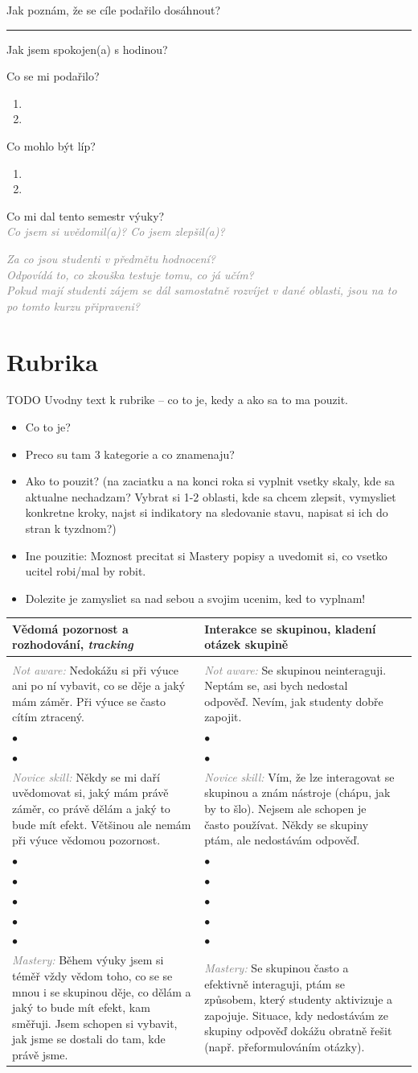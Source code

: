 \documentclass[twoside,openany]{book}
\makeatletter
\newlength{\rulelength}
\newcommand{\note}[1]{\textcolor{gray}{\small\itshape #1}}
\newcommand{\marginsection}[3]{\marginpar{\raisebox{#2\height}{
\begin{turn}{#1}
\bfseries \color{gray} \large
#3\end{turn}}}}
\newcommand{\smileys}{
Jak jsem spokojen(a) s hodinou?
\raisebox{-0.3em}{\,\,\Changey[2]{-2}\,\,\Changey[2]{-1}\,\,\Changey[2]{0}\,\,\Changey[2]{1}\,\,\Changey[2]{2}}
}
\newcommand{\selfassessment}{
Co se mi podařilo?
\begin{enumerate}
\item
\item
\end{enumerate}

Co mohlo být líp?
\begin{enumerate}
\item
\item
\end{enumerate}
}
\newcommand{\rubricpage}[8]{
\newpage
\begin{tabular}{@{}C{0.48\textwidth}C{0.48\textwidth}@{}l@{}}
\normalsize \bfseries #1 & \normalsize \bfseries #5 & \\[1em] \hline \\[-1.2em]
	\justify \note{Not aware:} #2 & \justify \note{Not aware:} #6 & \\[2em]
$\bullet$ & $\bullet$ & \\
$\bullet$ & $\bullet$ & \\
\justify \note{Novice skill:} #3 & \justify \note{Novice skill:} #7 & \\[3em]
$\bullet$ & $\bullet$ & \\
$\bullet$ & $\bullet$ & \\
$\bullet$ & $\bullet$ & \\
$\bullet$ & $\bullet$ & \\
$\bullet$ & $\bullet$ & \\
\justify \note{Mastery:} #4 & \justify \note{Mastery:} #8 &
\end{tabular}
}
\makeatother
\begin{document}
Jak poznám, že se cíle podařilo dosáhnout?

\hspace*{-1cm}
\rule{}{0.4pt}

\marginsection{90}{-1.2}{po výuce}

\smileys

\selfassessment

Co mi dal tento semestr výuky?\\
\note{Co jsem si uvědomil(a)? Co jsem zlepšil(a)?}

\newpage
\marginsection{-90}{1}{volné poznámky}
\vspace*{-2em}
\note{Za co jsou studenti v předmětu hodnocení?\\
Odpovídá to, co zkouška testuje tomu, co já učím?\\
Pokud mají studenti zájem se dál samostatně rozvíjet v dané oblasti, jsou na to po tomto kurzu připraveni?}


\restoregeometry
\chapter*{Rubrika}

TODO Uvodny text k rubrike -- co to je, kedy a ako sa to ma pouzit.
\begin{itemize}
\item Co to je?
\item Preco su tam 3 kategorie a co znamenaju?
\item Ako to pouzit? (na zaciatku a na konci roka si vyplnit vsetky skaly, kde sa aktualne nechadzam? Vybrat si 1-2 oblasti, kde sa chcem zlepsit, vymysliet konkretne kroky, najst si indikatory na sledovanie stavu, napisat si ich do stran k tyzdnom?)
\item Ine pouzitie: Moznost precitat si Mastery popisy a uvedomit si, co vsetko ucitel robi/mal by robit.
\item Dolezite je zamysliet sa nad sebou a svojim ucenim, ked to vyplnam!
\end{itemize}

\newpage
\rubricpage{Vědomá pozornost a rozhodování, \textit{tracking}}
{Nedokážu si při výuce ani po ní vybavit, co se děje a jaký mám záměr. Při výuce se často cítím ztracený.}
{Někdy se mi daří uvědomovat si, jaký mám právě záměr, co právě dělám a jaký to bude mít efekt. Většinou ale nemám při výuce vědomou pozornost.}
{Během výuky jsem si téměř vždy vědom toho, co se se mnou i se skupinou děje, co dělám a jaký to bude mít efekt, kam směřuji. Jsem schopen si vybavit, jak jsme se dostali do tam, kde právě jsme.}
{Interakce se skupinou, kladení otázek skupině}
{Se skupinou neinteraguji. Neptám se, asi bych nedostal odpověď. Nevím, jak studenty dobře zapojit.}
{Vím, že lze interagovat se skupinou a znám nástroje (chápu, jak by to šlo). Nejsem ale schopen je často používat. Někdy  se skupiny ptám, ale nedostávám odpověď.}
{Se skupinou často a efektivně interaguji, ptám se způsobem, který studenty aktivizuje a zapojuje. Situace, kdy nedostávám ze skupiny odpověď dokážu obratně řešit (např. přeformulováním otázky).}
\end{document}
